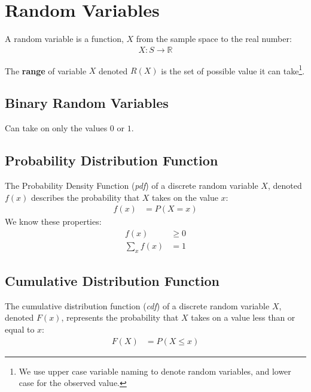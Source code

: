             \section{Random Variables} %
            \label{sec:random_variables}
                A random variable is a function, $X$ from the sample space to the real number:
                \begin{align*}
                    X : S \to \mathbb{R}
                \end{align*}

                The \textbf{range} of variable $X$ denoted $R(X)$ is the set of possible value it can take\footnote{We use upper case variable naming to denote random variables, and lower case for the observed value.}.

                \subsection{Binary Random Variables} %
                \label{sub:binary_random_variables}
                    Can take on only the values $0$ or $1$.
                \subsection{Probability Distribution Function} %
                \label{sub:probability_distribution_function}
                    The Probability Density Function (\emph{pdf}) of a discrete random variable $X$, denoted $f(x)$ describes the probability that $X$ takes on the value $x$:
                    \begin{align*}
                        f(x) &= P (X = x)
                    \end{align*}
                    We know these properties:
                    \begin{align*}
                        f(x) &\ge 0 \\
                        \sum_x f(x) &= 1
                    \end{align*}
                \subsection{Cumulative Distribution Function} %
                \label{sub:cumulative_dist}
                    The cumulative distribution function (\emph{cdf}) of a discrete random variable $X$, denoted $F(x)$, represents the probability that $X$ takes on a value less than or equal to $x$:
                    \begin{align*}
                        F(X) &= P(X \le x)
                    \end{align*}
